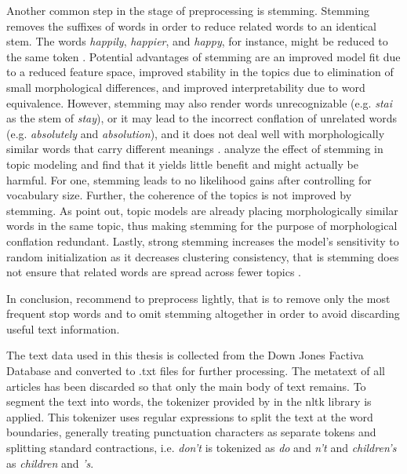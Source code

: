 \documentclass[11pt,a4paper,english,oneside]{book}
\numberwithin{equation}{chapter}
\begin{document}
Another common step in the stage of preprocessing is stemming. Stemming removes the suffixes of words in order to reduce related words to an identical stem. The words \textit{happily}, \textit{happier}, and \textit{happy}, for instance, might be reduced to the same token \cite[p. 287]{Schofield.2016}. Potential advantages of stemming are an improved model fit due to a reduced feature space, improved stability in the topics due to elimination of small morphological differences, and improved interpretability due to word equivalence.  However, stemming may also render words unrecognizable (e.g. \textit{stai} as the stem of \textit{stay}), or it may lead to the incorrect conflation of unrelated words (e.g. \textit{absolutely} and \textit{absolution}), and it does not deal well with morphologically similar words that carry different meanings \cite[p. 287]{Schofield.2016}. \cite{Schofield.2016} analyze the effect of stemming in topic modeling and find that it yields little benefit and might actually be harmful. For one, stemming leads to no likelihood gains after controlling for vocabulary size. Further, the coherence of the topics is not improved by stemming. As \citet{Schofield.2017} point out, topic models are already placing morphologically similar words in the same topic, thus making stemming for the purpose of morphological conflation redundant. Lastly, strong stemming increases the model's sensitivity to random initialization as it decreases clustering consistency, that is stemming does not ensure that related words are spread across fewer topics \cite[pp. 293--295]{Schofield.2016}.  

In conclusion, \cite{Schofield.2017} recommend to preprocess lightly, that is to remove only the most frequent stop words and to omit stemming altogether in order to avoid discarding useful text information. 

The text data used in this thesis is collected from the Down Jones Factiva Database and converted to .txt files for further processing. The metatext of all articles has been discarded so that only the main body of text remains. To segment the text into words, the tokenizer provided by \cite{Bird.2010} in the nltk library is applied. This tokenizer uses regular expressions to split the text at the word boundaries, generally treating punctuation characters as separate tokens and splitting standard contractions, i.e. \textit{don't} is tokenized as \textit{do} and \textit{n't} and \textit{children's} as \textit{children} and \textit{'s}. 
\end{document}
